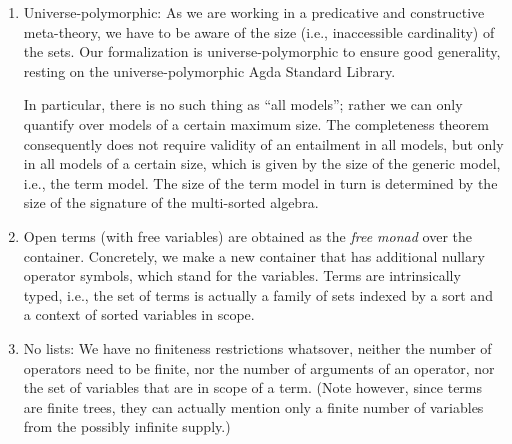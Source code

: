 {\begin{enumerate}
\begin{enumerate}
    \end{enumerate}

    Closed terms of a multi-sorted algebra
    (aka first-order terms) are then
    concrete interaction trees, i.e., elements of the indexed $W$-type
    pertaining to the container.

    Note that all the ``set''s we mentioned above come with a size,
    see next point.

  \item Universe-polymorphic:
    As we are working in a predicative and constructive
    meta-theory, we have to be aware of the size
    (i.e., inaccessible cardinality) of the sets.
    Our formalization is universe-polymorphic to ensure good
    generality, resting on the universe-polymorphic
    Agda Standard Library.

    In particular, there is no such thing as ``all models''; rather we
    can only quantify over models of a certain maximum size.
    The completeness theorem consequently does not require validity of
    an entailment in all models, but only in all models of a certain
    size, which is given by the size of the generic model, i.e., the
    term model.  The size of the term model in turn is determined by
    the size of the signature of the multi-sorted algebra.

  \item Open terms (with free variables) are obtained as the
    \emph{free monad} over the container.  Concretely, we make a new
    container that has additional nullary operator symbols, which
    stand for the variables.
    Terms are intrinsically typed, i.e., the set of terms is actually
    a family of sets indexed by a sort and a context of sorted
    variables in scope.

  \item No lists:
    We have no finiteness restrictions whatsover, neither the number
    of operators need to be finite, nor the number of arguments of an
    operator, nor the set of variables that are in scope of a term.
    (Note however, since terms are finite trees, they can actually
    mention only a finite number of variables from the possibly
    infinite supply.)

  \end{enumerate}
}
%

